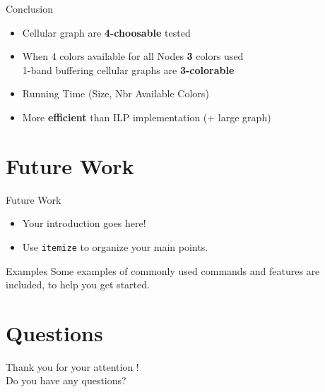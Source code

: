 \documentclass{beamer}
\begin{document}
\begin{frame}{Conclusion}

\begin{block}{}
\begin{itemize}
\item Cellular graph are \textbf{4-choosable} \textrightarrow{} tested
\item When 4 colors available for all Nodes \textrightarrow{} \textbf{3} colors used\\
\textrightarrow{} 1-band buffering cellular graphs are \textbf{3-colorable}
\end{itemize}
 
\end{block}
\vskip 1cm
\begin{block}{}

\begin{itemize}
\item Running Time (Size, Nbr Available Colors)
\item More \textbf{efficient} than ILP implementation (+ large graph)
\end{itemize}

\end{block}

\end{frame}


\section{Future Work}

\begin{frame}{Future Work}

\begin{itemize}
  \item Your introduction goes here!
  \item Use \texttt{itemize} to organize your main points.
\end{itemize}

\vskip 1cm

\begin{block}{Examples}
Some examples of commonly used commands and features are included, to help you get started.
\end{block}

\end{frame}

\section{Questions}

\begin{frame}
\Huge{Thank you for your attention !\\
Do you have any questions?}
\end{frame}
\end{document}
